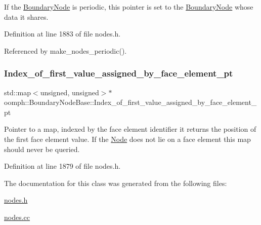 If the \hyperlink{classoomph_1_1BoundaryNode}{Boundary\+Node} is periodic, this pointer is set to the \hyperlink{classoomph_1_1BoundaryNode}{Boundary\+Node} whose data it shares. 



Definition at line 1883 of file nodes.\+h.



Referenced by make\+\_\+nodes\+\_\+periodic().

\mbox{\label{classoomph_1_1BoundaryNodeBase_a950c7d3ab5b9ee0473b45b2a134728a7}} 
\subsubsection{\texorpdfstring{Index\+\_\+of\+\_\+first\+\_\+value\+\_\+assigned\+\_\+by\+\_\+face\+\_\+element\+\_\+pt}{Index\_of\_first\_value\_assigned\_by\_face\_element\_pt}}
{\footnotesize\ttfamily std\+::map$<$unsigned, unsigned$>$$\ast$ oomph\+::\+Boundary\+Node\+Base\+::\+Index\+\_\+of\+\_\+first\+\_\+value\+\_\+assigned\+\_\+by\+\_\+face\+\_\+element\+\_\+pt\hspace{0.3cm}{\ttfamily [protected]}}



Pointer to a map, indexed by the face element identifier it returns the position of the first face element value. If the \hyperlink{classoomph_1_1Node}{Node} does not lie on a face element this map should never be queried. 



Definition at line 1879 of file nodes.\+h.



The documentation for this class was generated from the following files\+:\begin{DoxyCompactItemize}
\item 
\hyperlink{nodes_8h}{nodes.\+h}\item 
\hyperlink{nodes_8cc}{nodes.\+cc}\end{DoxyCompactItemize}
